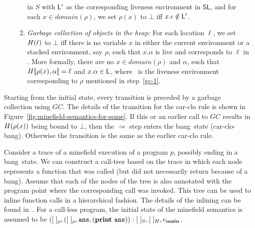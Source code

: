 \documentclass[preprint,9pt]{sigplanconf}
\newcommand{\oxlb}{\ensuremath{[\!|}}
\newcommand{\oxrb}{\ensuremath{|\!]}}
\newcommand{\ID}{\mbox{$\mathbf{ id}$}}
\newcommand{\bang}{\mbox{\sc bang}}
\begin{document}
\begin{enumerate}
\begin{enumerate}
    in $S$ 
    with  $\mathsf{L}'$   as  the   corresponding  liveness   environment  in
    $\mathsf{SL}$, and for each $x \in domain(\rho)$, we set $\rho(x)$
    to $\bot$ iff $x.\epsilon \notin \mathsf{L}'$.
  \item \emph{Garbage  collection of  objects in  the heap:}  For each
    location $\ell$,  we set $H(\ell)$  to $\bot$ iff there  is no
    variable  $x$  in either  the  current  environment or  a  stacked
    environment,  say  $\rho$,  such   that  $x.\alpha$  is  live  and
    corresponds  to   $\ell$ in \heap.  More  formally,  there   are  no  $x\in
    domain(\rho)$ and  $\alpha$, such that  $\heap\oxlb\rho(x), \alpha
    \oxrb = \ell$  and $x.\alpha \in \mathsf{L}$, where \Lv\  is the liveness
    environment corresponding to $\rho$ mentioned in step~\ref{gc-1}.
  \end{enumerate}
\end{enumerate}
Starting from the initial state,
every transition  is preceded  by a  garbage collection
using $GC$.  The details of the transition for the {\sc
  car-clo}  rule   is  shown   in
Figure~\ref{fig:minefield-semantics-for-some}.  If  this  or  an
earlier  call to  $GC$  results  in $H(\rho(x))$  being
bound  to  $\bot$,  then  the  $\rightsquigarrow$  step
enters the  \bang\ state ({\sc  car-clo-bang}). Otherwise
the transition is the same as the earlier {\sc car-clo}
rule. 



Consider a trace  of a minefield execution of a  program $p$, possibly
ending in  a \bang\ state. We  can construct a call-tree  based on the
trace in  which each node represents  a function that was  called (but
did not necessarily  return because of a \bang).  Assume  that each of
the nodes of  the tree is also annotated with  the program point where
the corresponding call  was invoked.  This tree can be  used to inline
function calls in a hierarchical fashion.  The details of the inlining
can be found in~\cite{asati14lgc}.
For  a
call-less program,  the initial state of  the minefield
semantics  is  assumed  to  be  $([\;]_\rho,([\;]_\rho,
\mathbf{\mbox{\tt ans}},      (\mathbf{print}~\mathbf{\mbox{\tt ans}})):[\;]_{S}     ,      [\;]_{H},
e_{\mathbf{main}}$.
  
\end{document}
